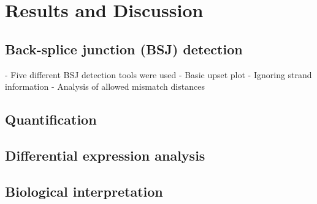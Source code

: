 \chapter{Results and Discussion}

\section{Back-splice junction (BSJ) detection}

- Five different BSJ detection tools were used
- Basic upset plot
- Ignoring strand information
- Analysis of allowed mismatch distances

\section{Quantification}

\section{Differential expression analysis}

\section{Biological interpretation}
